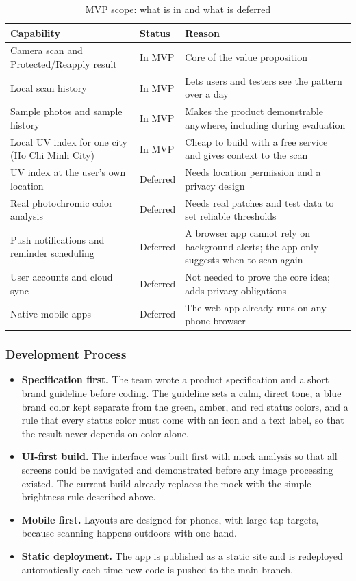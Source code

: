 \begin{table}[ht]
\centering\small
\caption{MVP scope: what is in and what is deferred}\label{tab:scope}
\begin{tabular}{@{}L{4.6cm}L{2.6cm}L{6.9cm}@{}}
  \toprule
  \textbf{Capability} & \textbf{Status} & \textbf{Reason}\\
  \midrule
  Camera scan and Protected/Reapply result & In MVP & Core of the value proposition\\
  Local scan history & In MVP & Lets users and testers see the pattern over a day\\
  Sample photos and sample history & In MVP & Makes the product demonstrable anywhere, including during evaluation\\
  Local UV index for one city (Ho Chi Minh City) & In MVP & Cheap to build with a free service and gives context to the scan\\
  UV index at the user's own location & Deferred & Needs location permission and a privacy design\\
  Real photochromic color analysis & Deferred & Needs real patches and test data to set reliable thresholds\\
  Push notifications and reminder scheduling & Deferred & A browser app cannot rely on background alerts; the app only suggests when to scan again\\
  User accounts and cloud sync & Deferred & Not needed to prove the core idea; adds privacy obligations\\
  Native mobile apps & Deferred & The web app already runs on any phone browser\\
  \bottomrule
\end{tabular}
\end{table}

\subsubsection{Development Process}
\begin{itemize}[itemsep=0pt]
  \item \textbf{Specification first.} The team wrote a product specification and a
    short brand guideline before coding. The guideline sets a calm, direct tone,
    a blue brand color kept separate from the green, amber, and red status colors,
    and a rule that every status color must come with an icon and a text label, so
    that the result never depends on color alone.
  \item \textbf{UI-first build.} The interface was built first with mock analysis so
    that all screens could be navigated and demonstrated before any image processing
    existed. The current build already replaces the mock with the simple brightness
    rule described above.
  \item \textbf{Mobile first.} Layouts are designed for phones, with large tap
    targets, because scanning happens outdoors with one hand.
  \item \textbf{Static deployment.} The app is published as a static site and is
    redeployed automatically each time new code is pushed to the main branch.
\end{itemize}

